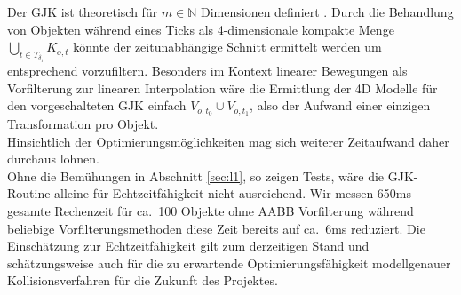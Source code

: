 Der GJK ist theoretisch für $m\in\mathbb{N}$ Dimensionen definiert \cite{gjk}. Durch die Behandlung von Objekten während eines Ticks als 4-dimensionale kompakte Menge $\bigcup_{t \in \Upsilon_{\delta_i}} K_{o,t}$ könnte der zeitunabhängige Schnitt ermittelt werden um entsprechend vorzufiltern. Besonders im Kontext linearer Bewegungen als Vorfilterung zur linearen Interpolation wäre die Ermittlung der 4D Modelle für den vorgeschalteten GJK einfach $V_{o, t_0} \cup V_{o, t_1}$, also der Aufwand einer einzigen Transformation pro Objekt.\\

Hinsichtlich der Optimierungsmöglichkeiten mag sich weiterer Zeitaufwand daher durchaus lohnen.\\

Ohne die Bemühungen in Abschnitt \ref{sec:l1}, so zeigen Tests, wäre die GJK-Routine alleine für Echtzeitfähigkeit nicht ausreichend. Wir messen 650ms gesamte Rechenzeit für ca.~100 Objekte ohne AABB Vorfilterung während beliebige Vorfilterungsmethoden diese Zeit bereits auf ca.~6ms reduziert. Die Einschätzung zur Echtzeitfähigkeit gilt zum derzeitigen Stand und schätzungsweise auch für die zu erwartende Optimierungsfähigkeit modellgenauer Kollisionsverfahren für die Zukunft des Projektes.